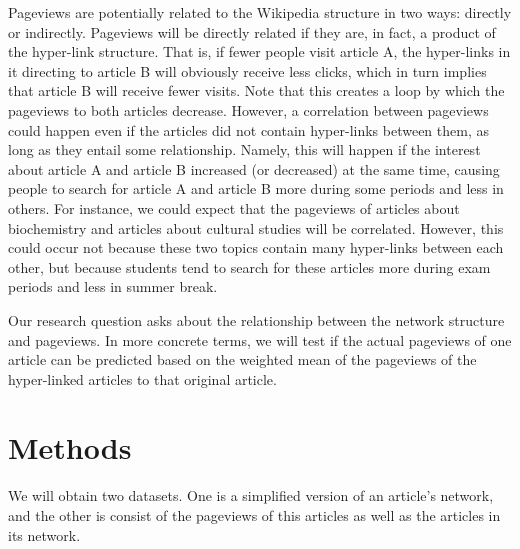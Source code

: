\documentclass[11pt]{article}
\begin{document}
Pageviews are potentially related to the Wikipedia structure in two ways: directly or indirectly. Pageviews will be directly related if they are, in fact, a product of the hyper-link structure. That is, if fewer people visit article A, the hyper-links in it directing to article B will obviously receive less clicks, which in turn implies that article B will receive fewer visits. Note that this creates a loop by which the pageviews to both articles decrease. However, a correlation between pageviews could happen even if the articles did not contain hyper-links between them, as long as they entail some relationship. Namely, this will happen if the interest about article A and article B increased (or decreased) at the same time, causing people to search for article A and article B more during some periods and less in others. For instance, we could expect that the pageviews of articles about biochemistry and articles about cultural studies will be correlated. However, this could occur not because these two topics contain many hyper-links between each other, but because students tend to search for these articles more during exam periods and less in summer break. 

Our research question asks about the relationship between the network structure and pageviews. In more concrete terms, we will test if the actual pageviews of one article can be predicted based on the weighted mean of the pageviews of the hyper-linked articles to that original article.

%





\section{Methods}

We will obtain two datasets. One is a simplified version of an article's network, and the other is consist of the pageviews of this articles as well as the articles in its network.
\end{document}

